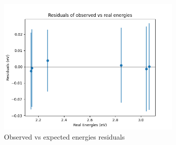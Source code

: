 \begin{figure}
    \centering
    \includegraphics[width=0.8\textwidth]{Results/Sections/Part1/Part1_energy_observed_vs_expected_residuals.png}
    \caption{Observed vs expected energies residuals}
    \label{fig:Part1energyU}
\end{figure}




